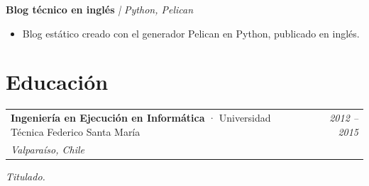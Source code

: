 \documentclass[a4paper,11pt]{article}
\makeatletter
\newcommand{\entrada}[4]{%
  \vspace{6pt}
  \begin{tabularx}{\textwidth}{@{}X r@{}}
    \textbf{#1} \textcolor{gris}{· #2} & \textcolor{grisCLaro}{\small\textit{#4}} \\
    \textcolor{grisCLaro}{\small\textit{#3}} & \\
  \end{tabularx}
  \vspace{2pt}
}
\newcommand{\proyecto}[2]{%
  \vspace{6pt}
  \textbf{#1} \quad \textcolor{gris}{\small\textit{| #2}}
  \vspace{2pt}
}
\makeatother
\begin{document}
\proyecto{Blog técnico en inglés}{Python, Pelican}
\begin{itemize}
  \item Blog estático creado con el generador Pelican en Python, publicado en inglés.
\end{itemize}

\section{Educación}

\entrada{Ingeniería en Ejecución en Informática}{Universidad Técnica Federico Santa María}{Valparaíso, Chile}{2012 -- 2015}
\textit{\textcolor{gris}{Titulado.}}
\end{document}
